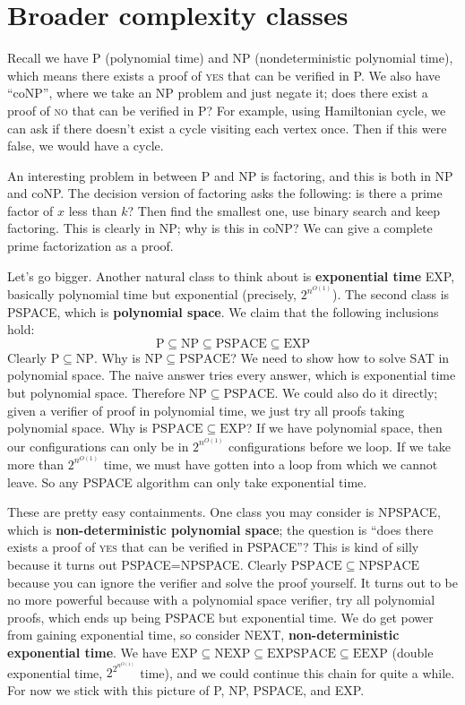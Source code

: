 \section{Broader complexity classes} 
Recall we have P (polynomial time) and NP (nondeterministic polynomial time), which means there exists a proof of \textsc{yes} that can be verified in P. We also have ``coNP'', where we take an NP problem and just negate it; does there exist a proof of \textsc{no} that can be verified in P? For example, using Hamiltonian cycle, we can ask if there doesn't exist a cycle visiting each vertex once. Then if this were false, we would have a cycle.

An interesting problem in between P and NP is factoring, and this is both in NP and coNP. The decision version of factoring asks the following: is there a prime factor of $x$ less than $k$? Then find the smallest one, use binary search and keep factoring. This is clearly in NP; why is this in coNP? We can give a complete prime factorization as a proof.

Let's go bigger. Another natural class to think about is \textbf{exponential time} EXP, basically polynomial time but exponential (precisely, $2 ^{n ^{O(1)}}$). The second class is PSPACE, which is \textbf{polynomial space}. We claim that the following inclusions hold: \[
\mathrm{P}\subseteq \mathrm{NP}\subseteq \mathrm{PSPACE}\subseteq \mathrm{EXP}
\] Clearly  $\mathrm{P}\subseteq \mathrm{NP}$. Why is $\mathrm{NP}\subseteq \mathrm{PSPACE}$? We need to show how to solve SAT in polynomial space. The naive answer tries every answer, which is exponential time but polynomial space. Therefore $\mathrm{NP}\subseteq \mathrm{PSPACE}$. We could also do it directly; given a verifier of proof in polynomial time, we just try all proofs taking polynomial space. Why is $\mathrm{PSPACE}\subseteq \mathrm{EXP}$? If we have polynomial space, then our configurations can only be in $2 ^{n ^{O(1)}}$ configurations before we loop. If we take more than $2 ^{n ^{O(1)}}$ time, we must have gotten into a loop from which we cannot leave. So any PSPACE algorithm can only take exponential time.

These are pretty easy containments. One class you may consider is NPSPACE, which is \textbf{non-deterministic polynomial space}; the question is ``does there exists a proof of \textsc{yes} that can be verified in PSPACE''? This is kind of silly because it turns out PSPACE=NPSPACE. Clearly $\mathrm{PSPACE}\subseteq \mathrm{NPSPACE}$ because you can ignore the verifier and solve the proof yourself. It turns out to be no more powerful because with a polynomial space verifier, try all polynomial proofs, which ends up being PSPACE but exponential time.
We do get power from gaining exponential time, so consider NEXT, \textbf{non-deterministic exponential time}. We have $\mathrm{EXP}\subseteq \mathrm{NEXP}\subseteq \mathrm{EXPSPACE}\subseteq \mathrm{EEXP}$ (double exponential time, $2 ^{2 ^{n ^{O(1)}}}$ time), and we could continue this chain for quite a while. For now we stick with this picture of P, NP, PSPACE, and EXP. 

